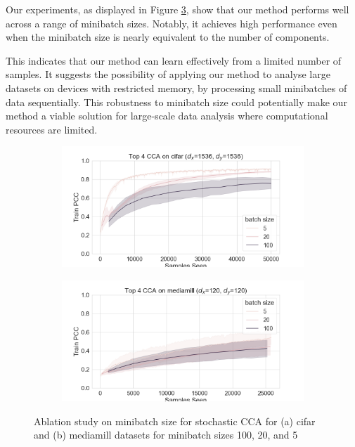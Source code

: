 Our experiments, as displayed in Figure \ref{fig:minibatch size ablation}, show that our method performs well across a range of minibatch sizes. Notably, it achieves high performance even when the minibatch size is nearly equivalent to the number of components.

This indicates that our method can learn effectively from a limited number of samples. It suggests the possibility of applying our method to analyse large datasets on devices with restricted memory, by processing small minibatches of data sequentially. This robustness to minibatch size could potentially make our method a viable solution for large-scale data analysis where computational resources are limited.

\begin{figure}[h]
    \centering
    \begin{subfigure}[b]{0.49\textwidth}
        \centering
        \includegraphics[width=\textwidth]{figures/gradient_descent/CCA/cifar_minibatch_size_ablation.png}
        \caption{}
        \label{fig:cifar_minibatch_ablation}
    \end{subfigure}
    \begin{subfigure}[b]{0.49\textwidth}
        \centering
        \includegraphics[width=\textwidth]{figures/gradient_descent/CCA/mediamill_minibatch_size_ablation.png}
        \caption{}
        \label{fig:mediamill_minibatch_ablation}
    \end{subfigure}
    \caption{Ablation study on minibatch size for stochastic CCA for (a) cifar and (b) mediamill datasets for minibatch sizes 100, 20, and 5}
    \label{fig:minibatch size ablation}
\end{figure}

